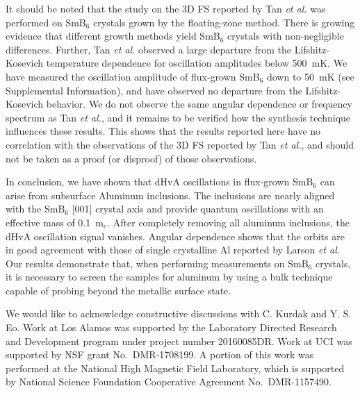\documentclass[twocolumn,preprintnumbers,amsmath,amssymb]{revtex4}
\begin{document}
It should be noted that the study on the 3D FS reported by Tan \textit{et al.} was performed on SmB$_6$ crystals grown by the floating-zone method.\cite{Tan2015}
There is growing evidence that different growth methods yield SmB$_{6}$ crystals with non-negligible differences.\cite{Phelan2016a,Valentine2016,YSEoMM2018}
Further, Tan \textit{et al.} observed a large departure from the Lifshitz-Kosevich temperature dependence for oscillation amplitudes below 500~mK.
We have measured the oscillation amplitude of flux-grown SmB$_{6}$ down to 50~mK (see Supplemental Information), and have observed no departure from the Lifshitz-Kosevich behavior.
We do not observe the same angular dependence or frequency spectrum as Tan \textit{et al.}, and it remains to be verified how the synthesis technique influences these results.
This shows that the results reported here have no correlation with the observations of the 3D FS reported by Tan \textit{et al.}, and should not be taken as a proof (or disproof) of those observations.\cite{Tan2015}

In conclusion, we have shown that dHvA oscillations in flux-grown SmB$_6$ can arise from subsurface Aluminum inclusions.
The inclusions are nearly aligned with the SmB$_6$ [001] crystal axis and provide quantum oscillations with an effective mass of 0.1~m$_e$.
After completely removing all aluminum inclusions, the dHvA oscillation signal vanishes.
Angular dependence shows that the orbits are in good agreement with those of single crystalline Al reported by Larson \textit{et al}.\cite{Larson1967}
Our results demonstrate that, when performing measurements on SmB$_6$ crystals, it is necessary to screen the samples for aluminum by using a bulk technique capable of probing beyond the metallic surface state.

\begin{acknowledgments}
We would like to acknowledge constructive discussions with C. Kurdak and Y. S. Eo.  
Work at Los Alamos was supported by the Laboratory Directed Research and Development program under project number 20160085DR.
Work at UCI was supported by NSF grant No.~DMR-1708199.  
A portion of this work was performed at the National High Magnetic Field Laboratory,
which is supported by National Science Foundation Cooperative Agreement No.~DMR-1157490.
\end{acknowledgments}
\end{document}
